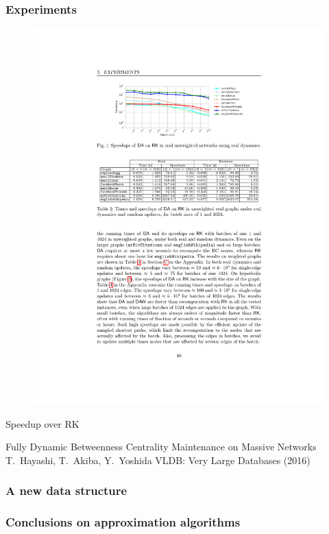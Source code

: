 \begin{frame}
  \frametitle{Experiments}
  \begin{figure}
    \includegraphics[width=\textwidth]{imgs/Bergamini-speedup.pdf}
  \end{figure}
  Speedup over RK
\end{frame}

\begin{frame}
  \centering
  \vfill
  {\huge Fully Dynamic Betweenness Centrality Maintenance on Massive
  Networks}
  \vfill
  {\Large T.~Hayashi, T.~Akiba, Y.~Yoshida}
  \vfill
  {\large VLDB: Very Large Databases (2016)}
  \vfill
\end{frame}

\begin{frame}
  \frametitle{A new data structure}
\end{frame}

\begin{frame}
  \frametitle{Conclusions on approximation algorithms}
\end{frame}
